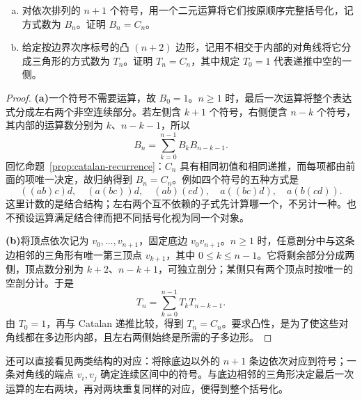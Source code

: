 \documentclass[lang=cn,a4paper,fontset=none,zihao=false,10pt,openany,twoside]{beautybook}
\numberwithin{algorithm}{chapter}
\begin{document}
\begin{example}[括号化与凸多边形的三角剖分]
\begin{enumerate}[(a)]
\item 对依次排列的 $n+1$ 个符号，用一个二元运算将它们按原顺序完整括号化，记方式数为 $B_n$。证明 $B_n=C_n$。
\item 给定按边界次序标号的凸 $(n+2)$ 边形，记用不相交于内部的对角线将它分成三角形的方式数为 $T_n$。证明 $T_n=C_n$，其中规定 $T_0=1$ 代表递推中空的一侧。
\end{enumerate}
\end{example}
\begin{proof}
\par\smallskip\noindent\textbf{(a)}\quad 一个符号不需要运算，故 $B_0=1$。$n\ge1$ 时，最后一次运算将整个表达式分成左右两个非空连续部分。若左侧含 $k+1$ 个符号，右侧便含 $n-k$ 个符号，其内部的运算数分别为 $k$、$n-k-1$，所以
\[
 B_n=\sum_{k=0}^{n-1}B_kB_{n-k-1}.
\]
回忆命题~\ref{prop:catalan-recurrence}：$C_n$ 具有相同初值和相同递推，而每项都由前面的项唯一决定，故归纳得到 $B_n=C_n$。例如四个符号的五种方式是
\[
 ((ab)c)d,\quad (a(bc))d,\quad (ab)(cd),\quad
 a((bc)d),\quad a(b(cd)).
\]
这里计数的是结合结构；左右两个互不依赖的子式先计算哪一个，不另计一种。也不预设运算满足结合律而把不同括号化视为同一个对象。

\par\smallskip\noindent\textbf{(b)}\quad 将顶点依次记为 $v_0,\ldots,v_{n+1}$，固定底边 $v_0v_{n+1}$。$n\ge1$ 时，任意剖分中与这条边相邻的三角形有唯一第三顶点 $v_{k+1}$，其中 $0\le k\le n-1$。它将剩余部分分成两侧，顶点数分别为 $k+2$、$n-k+1$，可独立剖分；某侧只有两个顶点时按唯一的空剖分计。于是
\[
 T_n=\sum_{k=0}^{n-1}T_kT_{n-k-1}.
\]
由 $T_0=1$，再与 Catalan 递推比较，得到 $T_n=C_n$。要求凸性，是为了使这些对角线都在多边形内部，且左右两侧始终是所需的子多边形。
\end{proof}
还可以直接看见两类结构的对应：将除底边以外的 $n+1$ 条边依次对应到符号；一条对角线的端点 $v_i,v_j$ 确定连续区间中的符号。与底边相邻的三角形决定最后一次运算的左右两块，再对两块重复同样的对应，便得到整个括号化。
\end{document}
